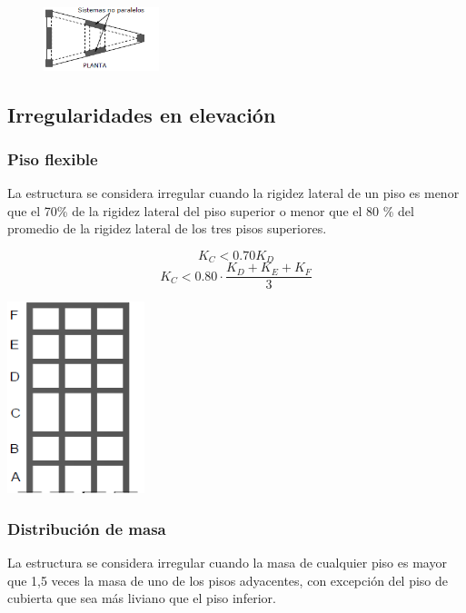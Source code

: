 \documentclass{report}
\begin{document}
\begin{figure}[h]
    \centering
    \includegraphics[width=0.3\textwidth]{imagenes/ejes_estructurales_no_paralelos.png}
\end{figure}

\subsection{Irregularidades en elevaci\'on }

\subsubsection{Piso flexible }
La estructura se considera irregular cuando la rigidez lateral de un piso es menor que el 70\% de la rigidez 
lateral del piso superior o menor que el 80 \% del promedio de la rigidez lateral de los tres pisos superiores.

\begin{center}
    \begin{minipage}{0.4\textwidth}
        \centering
        $$K_C < 0.70K_D$$
        $$K_C < 0.80 \cdot \dfrac{K_D + K_E + K_F}{3}$$
    \end{minipage}%
    \begin{minipage}{0.4\textwidth}
        \centering
        \includegraphics[width=0.3\textwidth]{imagenes/piso_flexible.png}
    \end{minipage}
\end{center}

\subsubsection{Distribuci\'on de masa }
La estructura se considera irregular cuando la masa de cualquier piso es mayor que 1,5 veces la masa 
de uno de los pisos adyacentes, con excepci\'on del piso de cubierta que sea m\'as liviano que el piso inferior.
\end{document}
